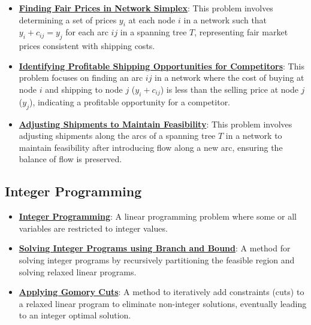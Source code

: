 \documentclass{article}%
\begin{document}
\begin{itemize}[leftmargin=*]
\item \href{https://www.math.purdue.edu/~yipn/421//2024-11-21-EconNetSimplex.pdf#page=4}{\textbf{Finding Fair Prices in Network Simplex}}: This problem involves determining a set of prices $y_i$ at each node $i$ in a network such that $y_i + c_{ij} = y_j$ for each arc $ij$ in a spanning tree $T$, representing fair market prices consistent with shipping costs.%
\item \href{https://www.math.purdue.edu/~yipn/421//2024-11-21-EconNetSimplex.pdf#page=5}{\textbf{Identifying Profitable Shipping Opportunities for Competitors}}: This problem focuses on finding an arc $ij$ in a network where the cost of buying at node $i$ and shipping to node $j$ ($y_i + c_{ij}$) is less than the selling price at node $j$ ($y_j$), indicating a profitable opportunity for a competitor.%
\item \href{https://www.math.purdue.edu/~yipn/421//2024-11-21-EconNetSimplex.pdf#page=6}{\textbf{Adjusting Shipments to Maintain Feasibility}}: This problem involves adjusting shipments along the arcs of a spanning tree $T$ in a network to maintain feasibility after introducing flow along a new arc, ensuring the balance of flow is preserved.%
\end{itemize}

%
\subsection{Integer Programming}%
\label{subsec:IntegerProgramming}%
\begin{itemize}[leftmargin=*]%
\item \href{https://www.math.purdue.edu/~yipn/421//2024-10-31-IntLinProg.pdf#page=1}{\textbf{Integer Programming}}: A linear programming problem where some or all variables are restricted to integer values.%
\item \href{https://www.math.purdue.edu/~yipn/421//2024-10-31-IntLinProg.pdf#page=5}{\textbf{Solving Integer Programs using Branch and Bound}}: A method for solving integer programs by recursively partitioning the feasible region and solving relaxed linear programs.%
\item \href{https://www.math.purdue.edu/~yipn/421//2024-10-31-IntLinProg.pdf#page=15}{\textbf{Applying Gomory Cuts}}: A method to iteratively add constraints (cuts) to a relaxed linear program to eliminate non-integer solutions, eventually leading to an integer optimal solution.%
\end{itemize}
\end{document}
